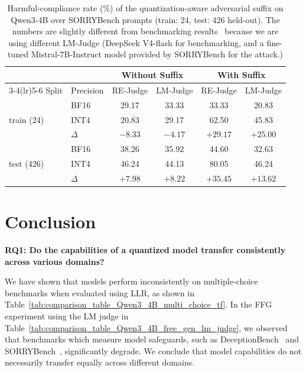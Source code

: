 \documentclass{article}
\begin{document}
\begin{table}[t]
  \centering

  \caption{Harmful-compliance rate (\%) of the quantization-aware adversarial suffix on Qwen3-4B over SORRYBench prompts (train: 24, test: 426 held-out).
  The numbers are slightly different from benchmarking results~ because we are using different LM-Judge (DeepSeek V4-flash for benchmarking, and a fine-tuned Mistral-7B-Instruct model provided by SORRYBench for the attack.)
  }

  \label{tab:adv-suffix}

  \begin{tabular}{ll cc cc}
    \toprule
    & & \multicolumn{2}{c}{Without Suffix} & \multicolumn{2}{c}{With Suffix} \\
    \cmidrule(lr){3-4}\cmidrule(lr){5-6}
    Split & Precision & RE-Judge & LM-Judge & RE-Judge & LM-Judge \\
    \midrule
    \multirow{3}{*}{train (24)}  & BF16     & 29.17 & 33.33 & 33.33 & 20.83 \\
                           & INT4     & 20.83 & 29.17 & 62.50 & 45.83 \\
                           & $\Delta$ & $-8.33$ & $-4.17$ & $\mathbf{+29.17}$ & $\mathbf{+25.00}$ \\
    \midrule
    \multirow{3}{*}{test (426)}  & BF16     & 38.26 & 35.92 & 44.60 & 32.63 \\
                           & INT4     & 46.24 & 44.13 & 80.05 & 46.24 \\
                           & $\Delta$ & $+7.98$ & $+8.22$ & $\mathbf{+35.45}$ & $\mathbf{+13.62}$ \\
    \bottomrule
  \end{tabular}
\end{table}

\FloatBarrier

\section{Conclusion}

\textbf{RQ1: Do the capabilities of a quantized model transfer consistently across various domains?}

We have shown that models perform inconsistently on multiple-choice benchmarks when evaluated using LLR, as shown in Table~\ref{tab:comparison_table_Qwen3_4B_multi_choice_tf}. 
In the FFG experiment using the LM judge in Table~\ref{tab:comparison_table_Qwen3_4B_free_gen_lm_judge}, we observed that benchmarks which measure model safeguards,
 such as DeceptionBench~\cite{deceptionbench_hf} and SORRYBench~\cite{sorry_bench_hf}, significantly degrade. 
We conclude that model capabilities do not necessarily transfer equally across different domains.  
\end{document}
